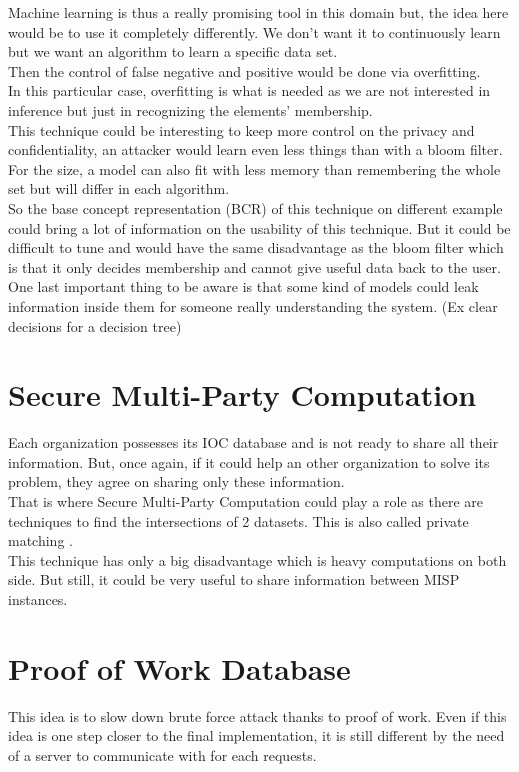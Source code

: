 \documentclass{eplmastersthesis}
\begin{document}
Machine learning is thus a really promising tool in this domain but, the idea here would be to use it completely differently. We don't want it to continuously learn but we want an algorithm to learn a specific data set.\\
Then the control of false negative and positive would be done via overfitting.\\
In this particular case, overfitting is what is needed as we are not interested in inference but just in recognizing the elements' membership.\\

This technique could be interesting to keep more control on the privacy and confidentiality, an attacker would learn even less things than with a bloom filter.\\
For the size, a model can also fit with less memory than remembering the whole set but will differ in each algorithm.\\
So the base concept representation (BCR) of this technique on different example could bring a lot of information on the usability of this technique. But it could be difficult to tune and would have the same disadvantage as the bloom filter which is that it only decides membership and cannot give useful data back to the user. One last important thing to be aware is that some kind of models could leak information inside them for someone really understanding the system. (Ex clear decisions for a decision tree)\\



\section{Secure Multi-Party Computation}
Each organization possesses its IOC database and is not ready to share all their information. But, once again, if it could help an other organization to solve its problem, they agree on sharing only these information.\\
That is where Secure Multi-Party Computation could play a role as there are techniques to find the intersections of 2 datasets. This is also called private matching \cite{agrawal2003information, li2005private}.\\

This technique has only a big disadvantage which is heavy computations on both side. But still, it could be very useful to share information between MISP instances.

\section{Proof of Work Database}
This idea is to slow down brute force attack thanks to proof of work. Even if this idea is one step closer to the final implementation, it is still different by the need of a server to communicate with for each requests.\\
\end{document}
